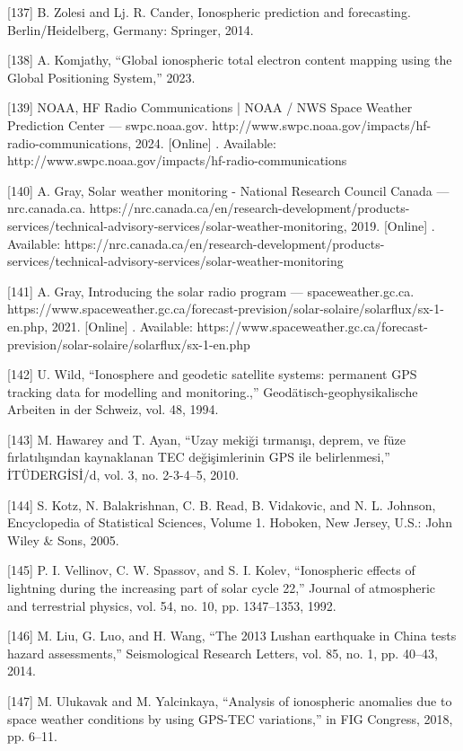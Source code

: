 \documentclass[sn-mathphys-num]{sn-jnl}%
\begin{document}
[137] B. Zolesi and Lj. R. Cander, Ionospheric prediction and forecasting. Berlin/Heidelberg, Germany: Springer, 2014.

[138] A. Komjathy, “Global ionospheric total electron content mapping using the Global Positioning System,” 2023.

[139] NOAA, HF Radio Communications | NOAA / NWS Space Weather Prediction Center — swpc.noaa.gov. http://www.swpc.noaa.gov/impacts/hf-radio-communications, 2024. [Online] . Available: http://www.swpc.noaa.gov/impacts/hf-radio-communications

[140] A. Gray, Solar weather monitoring - National Research Council Canada — nrc.canada.ca. https://nrc.canada.ca/en/research-development/products-services/technical-advisory-services/solar-weather-monitoring, 2019. [Online] . Available: https://nrc.canada.ca/en/research-development/products-services/technical-advisory-services/solar-weather-monitoring

[141] A. Gray, Introducing the solar radio program — spaceweather.gc.ca. https://www.spaceweather.gc.ca/forecast-prevision/solar-solaire/solarflux/sx-1-en.php, 2021. [Online] . Available: https://www.spaceweather.gc.ca/forecast-prevision/solar-solaire/solarflux/sx-1-en.php

[142] U. Wild, “Ionosphere and geodetic satellite systems: permanent GPS tracking data for modelling and monitoring.,” Geodätisch-geophysikalische Arbeiten in der Schweiz, vol. 48, 1994.

[143] M. Hawarey and T. Ayan, “Uzay mekiği tırmanışı, deprem, ve füze fırlatılışından kaynaklanan TEC değişimlerinin GPS ile belirlenmesi,” İTÜDERGİSİ/d, vol. 3, no. 2-3-4–5, 2010.

[144] S. Kotz, N. Balakrishnan, C. B. Read, B. Vidakovic, and N. L. Johnson, Encyclopedia of Statistical Sciences, Volume 1. Hoboken, New Jersey, U.S.: John Wiley & Sons, 2005.

[145] P. I. Vellinov, C. W. Spassov, and S. I. Kolev, “Ionospheric effects of lightning during the increasing part of solar cycle 22,” Journal of atmospheric and terrestrial physics, vol. 54, no. 10, pp. 1347–1353, 1992.

[146] M. Liu, G. Luo, and H. Wang, “The 2013 Lushan earthquake in China tests hazard assessments,” Seismological Research Letters, vol. 85, no. 1, pp. 40–43, 2014.

[147] M. Ulukavak and M. Yalcinkaya, “Analysis of ionospheric anomalies due to space weather conditions by using GPS-TEC variations,” in FIG Congress, 2018, pp. 6–11.
\end{document}
